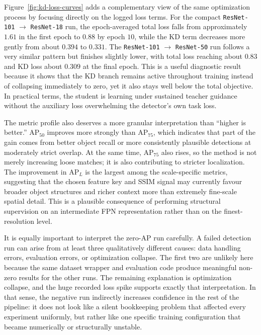 Figure~\ref{fig:kd-loss-curves} adds a complementary view of the same optimization process by focusing directly on the logged loss terms. For the compact \texttt{ResNet-101} $\rightarrow$ \texttt{ResNet-18} run, the epoch-averaged total loss falls from approximately $1.61$ in the first epoch to $0.88$ by epoch $10$, while the KD term decreases more gently from about $0.394$ to $0.331$. The \texttt{ResNet-101} $\rightarrow$ \texttt{ResNet-50} run follows a very similar pattern but finishes slightly lower, with total loss reaching about $0.83$ and KD loss about $0.309$ at the final epoch. This is a useful diagnostic result because it shows that the KD branch remains active throughout training instead of collapsing immediately to zero, yet it also stays well below the total objective. In practical terms, the student is learning under sustained teacher guidance without the auxiliary loss overwhelming the detector's own task loss.

The metric profile also deserves a more granular interpretation than ``higher is better.'' AP$_{50}$ improves more strongly than AP$_{75}$, which indicates that part of the gain comes from better object recall or more consistently plausible detections at moderately strict overlap. At the same time, AP$_{75}$ also rises, so the method is not merely increasing loose matches; it is also contributing to stricter localization. The improvement in AP$_L$ is the largest among the scale-specific metrics, suggesting that the chosen feature key and SSIM signal may currently favour broader object structures and richer context more than extremely fine-scale spatial detail. This is a plausible consequence of performing structural supervision on an intermediate FPN representation rather than on the finest-resolution level.

It is equally important to interpret the zero-AP run carefully. A failed detection run can arise from at least three qualitatively different causes: data handling errors, evaluation errors, or optimization collapse. The first two are unlikely here because the same dataset wrapper and evaluation code produce meaningful non-zero results for the other runs. The remaining explanation is optimization collapse, and the huge recorded loss spike supports exactly that interpretation. In that sense, the negative run indirectly increases confidence in the rest of the pipeline: it does not look like a silent bookkeeping problem that affected every experiment uniformly, but rather like one specific training configuration that became numerically or structurally unstable.

